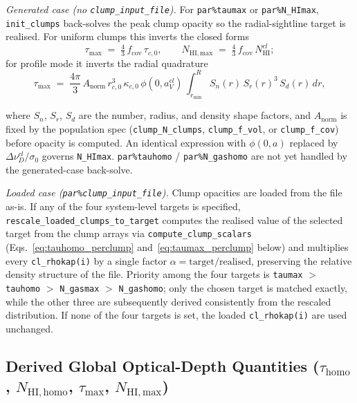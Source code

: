 \documentclass[english,a4paper]{my_memo}
\begin{document}
\textit{Generated case (no \texttt{clump\_input\_file}).}  For
\texttt{par\%taumax} or \texttt{par\%N\_HImax}, \texttt{init\_clumps}
back-solves the peak clump opacity so the radial-sightline target is
realised.  For uniform clumps this inverts the closed forms
\begin{equation}
  \tau_\mathrm{max}      \;=\; \tfrac{4}{3}\,f_\mathrm{cov}\,\tau_{c,0},
  \qquad
  N_\mathrm{HI,max}      \;=\; \tfrac{4}{3}\,f_\mathrm{cov}\,N_\mathrm{HI}^{cl};
\label{eq:taumax_uniform}
\end{equation}
for profile mode it inverts the radial quadrature
\begin{equation}
  \tau_\mathrm{max} \;=\;
    \frac{4\pi}{3}\,A_\mathrm{norm}\,r_{c,0}^3\,\kappa_{c,0}\,\phi(0,a_V^{cl})
    \,\int_{r_\mathrm{min}}^{R} S_n(r)\,S_r(r)^3\,S_d(r)\,dr,
\end{equation}
\begin{sloppypar}
where $S_n$, $S_r$, $S_d$ are the number, radius, and density shape
factors, and $A_\mathrm{norm}$ is fixed by the population spec
(\texttt{clump\_N\_clumps}, \texttt{clump\_f\_vol}, or
\texttt{clump\_f\_cov}) before opacity is computed.  An identical
expression with $\phi(0,a)$ replaced by $\Delta\nu_D^{cl}/\sigma_0$
governs \texttt{N\_HImax}.  \texttt{par\%tauhomo} /
\texttt{par\%N\_gashomo} are not yet handled by the generated-case
back-solve.
\end{sloppypar}

\textit{Loaded case (\texttt{par\%clump\_input\_file}).}  Clump
opacities are loaded from the file as-is.  If any of the four system-level
targets is specified, \texttt{rescale\_loaded\_clumps\_to\_target}
computes the realised value of the selected target from the clump
arrays via \texttt{compute\_clump\_scalars} (Eqs.~\ref{eq:tauhomo_perclump}
and~\ref{eq:taumax_perclump} below) and multiplies every
\texttt{cl\_rhokap(i)} by a single factor
$\alpha = \mathrm{target}/\mathrm{realised}$, preserving the relative
density structure of the file.  Priority among the four targets is
\texttt{taumax} $>$ \texttt{tauhomo} $>$ \texttt{N\_gasmax} $>$
\texttt{N\_gashomo}; only the chosen target is matched exactly, while the
other three are subsequently derived consistently from the rescaled
distribution.  If none of the four targets is set, the loaded
\texttt{cl\_rhokap(i)} are used unchanged.

\subsection{Derived Global Optical-Depth Quantities ($\tau_\mathrm{homo}$,
$N_\mathrm{HI,homo}$, $\tau_\mathrm{max}$, $N_\mathrm{HI,max}$)}
\label{subsec:tauhomo}
\end{document}
